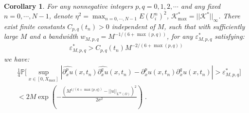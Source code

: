\documentclass[a4paper,11pt]{article}
\newtheorem{corollary}{Corollary}[section]
\theoremstyle{definition}
\begin{document}
\begin{corollary}\label{cor.doublespace}
For any nonnegative integers $p,q=0,1,2,\cdots$ and any fixed $n=0,\cdots,N-1$, denote $\eta^2 = \max_{n=0,\cdots,N-1}E(U_i^n)^2$, $\mathcal{K}^*_{\max}=||\mathcal{K}^*||_\infty$. There exist finite constants $C_{p,q}(t_n)>0$ independent of $M$, such that with sufficiently large $M$ and a bandwidth $w_{M,p,q} =M^{-1/(6+\max(p,q))}$,  for any $\varepsilon_{M,p,q}^*$ satisfying:
\begin{align*}
\varepsilon_{M,p,q}^*> C_{p,q}(t_n)M^{-2/(6+\max(p,q))}
\end{align*}
we have:
\begin{align*}
&\frac{1}{4}\mathbb{P}\Big[\sup_{x\in[0,X_{\max}]}|\widehat{\partial_x^pu}(x,t_n)\widehat{\partial_x^qu}(x,t_n)-\partial_x^pu(x,t_n)\partial_x^qu(x,t_n)|>\varepsilon_{M,p,q}^*\Big]\nonumber\\
&<2M \exp(-\frac{(M^{1/(6+\max\{p,q\})}-||u||_{L^\infty(\Omega)})^2}{2\sigma^2})\;.
\end{align*}	
\end{corollary}
\end{document}
